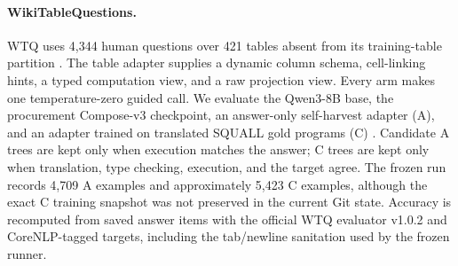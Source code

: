 \paragraph{WikiTableQuestions.}
WTQ uses 4,344 human questions over 421 tables absent from its training-table partition
\citep{pasupat2015compositional}.  The table adapter supplies a dynamic column schema, cell-linking
hints, a typed computation view, and a raw projection view.  Every arm makes one temperature-zero
guided call.  We evaluate the Qwen3-8B base, the procurement Compose-v3 checkpoint, an answer-only
self-harvest adapter (A), and an adapter trained on translated SQUALL gold programs (C)
\citep{shi2020squall}.  Candidate A trees are kept only when execution matches the answer; C trees
are kept only when translation, type checking, execution, and the target agree.  The frozen run
records 4,709 A examples and approximately 5,423 C examples, although the exact C training snapshot
was not preserved in the current Git state.  Accuracy is recomputed from saved answer items with
the official WTQ evaluator v1.0.2 and CoreNLP-tagged targets, including the tab/newline sanitation
used by the frozen runner.
